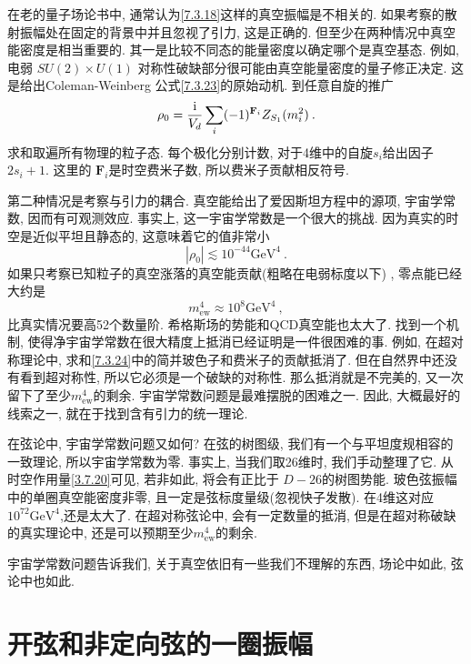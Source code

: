在老的量子场论书中, 通常认为\eqref{7.3.18}这样的真空振幅是不相关的. 如果考察的散射振幅处在固定的背景中并且忽视了引力, 这是正确的. 
但至少在两种情况中真空能密度是相当重要的. 其一是比较不同态的能量密度以确定哪个是真空基态. 例如, 电弱 $S U(2) \times U(1)$ 对称性破缺部分很可能由真空能量密度的量子修正决定. 这是给出Coleman-Weinberg 公式\eqref{7.3.23}的原始动机. 到任意自旋的推广
\begin{equation}
	\rho_{0}=\frac{\mathrm{i}}{V_{d}} \sum_{i}(-1)^{\mathbf{F}_{i}} Z_{S_{1}}(m_{i}^{2}) \:. \label{7.3.24}
\end{equation}
求和取遍所有物理的粒子态. 每个极化分别计数, 对于4维中的自旋$s_{i}$给出因子 $2 s_{i}+1$. 这里的 $\mathbf{F}_{i}$是时空费米子数, 所以费米子贡献相反符号.

第二种情况是考察与引力的耦合. 真空能给出了爱因斯坦方程中的源项, 宇宙学常数, 因而有可观测效应. 事实上, 这一宇宙学常数是一个很大的挑战. 
因为真实的时空是近似平坦且静态的, 这意味着它的值非常小
\begin{equation}
	|\rho_{0}| \lesssim 10^{-44} \mathrm{GeV}^{4} \:. \label{7.3.25}
\end{equation}
如果只考察已知粒子的真空涨落的真空能贡献(粗略在电弱标度以下) , 零点能已经大约是
\begin{equation}
	m_{\mathrm{ew}}^{4} \approx 10^{8} \mathrm{GeV}^{4} \:, \label{7.3.26}
\end{equation}
比真实情况要高52个数量阶. 希格斯场的势能和QCD真空能也太大了. 找到一个机制, 使得净宇宙学常数在很大精度上抵消已经证明是一件很困难的事. 例如, 
在超对称理论中, 求和\eqref{7.3.24}中的简并玻色子和费米子的贡献抵消了. 但在自然界中还没有看到超对称性, 所以它必须是一个破缺的对称性. 
那么抵消就是不完美的, 又一次留下了至少$m_{\mathrm{ew}}^{4} $的剩余. 宇宙学常数问题是最难摆脱的困难之一. 因此, 大概最好的线索之一, 就在于找到含有引力的统一理论.

在弦论中, 宇宙学常数问题又如何? 在弦的树图级, 我们有一个与平坦度规相容的一致理论, 所以宇宙学常数为零. 事实上, 当我们取26维时, 我们手动整理了它. 
从时空作用量\eqref{3.7.20}可见, 若非如此, 将会有正比于 $D-26$的树图势能. 玻色弦振幅中的单圈真空能密度非零, 且一定是弦标度量级(忽视快子发散). 
在4维这对应 $10^{72} \mathrm{GeV}^{4}$,还是太大了. 在超对称弦论中, 会有一定数量的抵消, 但是在超对称破缺的真实理论中, 
还是可以预期至少$m_{\mathrm{ew}}^{4}$的剩余.

宇宙学常数问题告诉我们, 关于真空依旧有一些我们不理解的东西, 场论中如此, 弦论中也如此.

\section{开弦和非定向弦的一圈振幅} \label{sec:7.4}%

